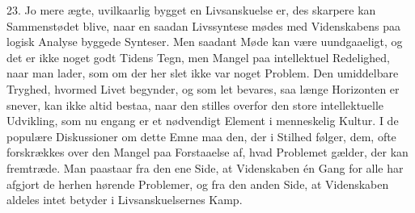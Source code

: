 \documentclass[12pt]{article}
\newcommand{\apage}[1]{\marginnote{\footnotesize\textit{[#1]}}}
\begin{document}
23. Jo mere ægte, uvilkaarlig bygget en Livsanskuelse er, des skarpere kan
Sammenstødet blive, naar en saadan Livssyntese mødes med Videnskabens paa
logisk Analyse byggede Synteser. Men saadant Møde kan være uundgaaeligt, og det
er ikke noget godt Tidens Tegn, men Mangel paa intellektuel Redelighed, naar
man lader, som om der her slet ikke var noget Problem. Den umiddelbare Tryghed,
\setcounter{footnote}{0}%
\apage{72}hvormed Livet begynder, og som let bevares, saa længe Horizonten er
snever, kan ikke altid bestaa, naar den stilles overfor den store
intellektuelle Udvikling, som nu engang er et nødvendigt Element i menneskelig
Kultur. I de populære Diskussioner om dette Emne maa den, der i Stilhed følger,
dem, ofte forskrækkes over den Mangel paa Forstaaelse af, hvad Problemet
gælder, der kan fremtræde. Man paastaar fra den ene Side, at Videnskaben én
Gang for alle har afgjort de herhen hørende Problemer, og fra den anden Side,
at Videnskaben aldeles intet betyder i Livsanskuelsernes Kamp.
\end{document}
